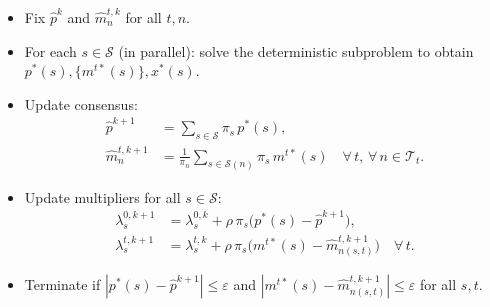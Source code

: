 \documentclass[trsc,nonblindrev]{informs3noheader}
\begin{document}
\begin{itemize}
    \item Fix $\hat{p}^k$ and $\hat{m}^{t,k}_n$ for all $t,n$.
    \item For each $s\in\mathcal{S}$ (in parallel): solve the 
          deterministic subproblem to obtain 
          $p^*(s),\{m^{t*}(s)\},x^*(s)$.
    \item Update consensus:
    \begin{align}
        \hat{p}^{k+1} &= \sum_{s\in\mathcal{S}}\pi_s\,p^*(s),\\
        \hat{m}^{t,k+1}_n &= \frac{1}{\pi_n}
            \sum_{s\in\mathcal{S}(n)}\pi_s\,m^{t*}(s)
            \quad \forall\,t,\,\forall\,n\in\mathcal{T}_t.
    \end{align}
    \item Update multipliers for all $s\in\mathcal{S}$:
    \begin{align}
        \lambda^{0,k+1}_s &= \lambda^{0,k}_s
            +\rho\,\pi_s\big(p^*(s)-\hat{p}^{k+1}\big),\\
        \lambda^{t,k+1}_s &= \lambda^{t,k}_s
            +\rho\,\pi_s\big(m^{t*}(s)
            -\hat{m}^{t,k+1}_{n(s,t)}\big)
            \quad \forall\,t.
    \end{align}
    \item Terminate if $|p^*(s)-\hat{p}^{k+1}|\le\varepsilon$ and 
          $|m^{t*}(s)-\hat{m}^{t,k+1}_{n(s,t)}|\le\varepsilon$ 
          for all $s,t$.
\end{itemize}


\printbibliography
\end{document}
